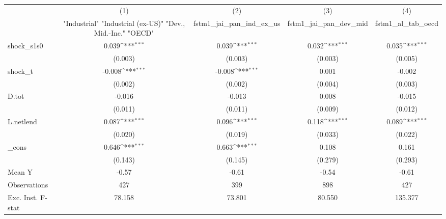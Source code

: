{
\def\sym#1{\ifmmode^{#1}\else\(^{#1}\)\fi}
\begin{tabular}{l*{4}{c}}
\toprule
            &\multicolumn{1}{c}{(1)}&\multicolumn{1}{c}{(2)}&\multicolumn{1}{c}{(3)}&\multicolumn{1}{c}{(4)}\\
            &\multicolumn{1}{c}{ "Industrial" "Industrial (ex-US)" "Dev., Mid.-Inc." "OECD" }&\multicolumn{1}{c}{fstm1\_jai\_pan\_ind\_ex\_us}&\multicolumn{1}{c}{fstm1\_jai\_pan\_dev\_mid}&\multicolumn{1}{c}{fstm1\_al\_tab\_oecd}\\
\midrule
shock\_s1s0  &       0.039\sym{***}&       0.039\sym{***}&       0.032\sym{***}&       0.035\sym{***}\\
            &     (0.003)         &     (0.003)         &     (0.003)         &     (0.005)         \\
\addlinespace
shock\_t     &      -0.008\sym{***}&      -0.008\sym{***}&       0.001         &      -0.002         \\
            &     (0.002)         &     (0.002)         &     (0.004)         &     (0.003)         \\
\addlinespace
D.tot       &      -0.016         &      -0.013         &       0.008         &      -0.015         \\
            &     (0.011)         &     (0.011)         &     (0.009)         &     (0.012)         \\
\addlinespace
L.netlend   &       0.087\sym{***}&       0.096\sym{***}&       0.118\sym{***}&       0.089\sym{***}\\
            &     (0.020)         &     (0.019)         &     (0.033)         &     (0.022)         \\
\addlinespace
\_cons      &       0.646\sym{***}&       0.663\sym{***}&       0.108         &       0.161         \\
            &     (0.143)         &     (0.145)         &     (0.279)         &     (0.293)         \\
\midrule
Mean Y      &       -0.57         &       -0.61         &       -0.54         &       -0.61         \\
Observations&         427         &         399         &         898         &         427         \\
Exc. Inst. F-stat&      78.158         &      73.801         &      80.550         &     135.377         \\
\bottomrule
\end{tabular}
}
